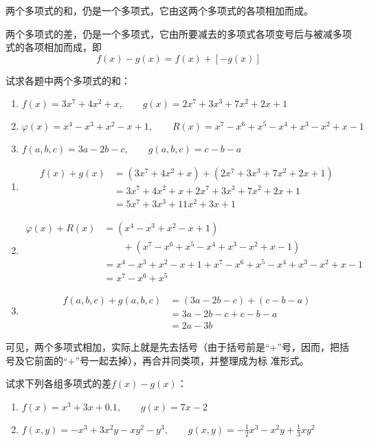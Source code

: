 两个多项式的和，仍是一个多项式，它由这两个多项式的各项相加而成。

两个多项式的差，仍是一个多项式，它由所要减去的多项式各项变号后与被减多项式的各项相加而成，即 
\[f(x)-g(x)=f(x)+[-g(x)]\]

\begin{example}
    试求各题中两个多项式的和：
\begin{enumerate}
    \item $f(x)=3x^7+4x^2+x,\qquad g(x)=2x^7+3x^3+7x^2+2x+1$
    \item $\varphi(x)=x^4-x^3+x^2-x+1,\qquad R(x)=x^7-x^6+x^5-x^4+x^3-x^2+x-1$
    \item $f(a,b,c)=3a-2b-c,\qquad g(a,b,c)=c-b-a$
\end{enumerate}

\end{example}

\begin{solution}
\begin{enumerate}
    \item \[\begin{split}
        f(x)+g(x)&=(3x^7+4x^2+x)+(2x^7+3x^3+7x^2+2x+1)\\
        &=3x^7+4x^2+x+2x^7+3x^3+7x^2+2x+1\\
&=5x^7+3x^3+11x^2+3x+1
    \end{split}\]
    \item \[\begin{split}
        \varphi(x)+R(x)&=(x^4-x^3+x^2-x+1)\\
        &\qquad +(x^7-x^6+x^5-x^4+x^3-x^2+x-1)\\
        &=x^4-x^3+x^2-x+1+x^7-x^6+x^5-x^4+x^3-x^2+x-1\\
        &=x^7-x^6+x^5
    \end{split}\]
    \item \[\begin{split}
        f(a,b,c)+g(a,b,c)&=(3a-2b-c)+(c-b-a)\\
        &=3a-2b-c+c-b-a\\
&=2a-3b        
    \end{split}\]
\end{enumerate}    
\end{solution}

可见，两个多项式相加，实际上就是先去括号（由于括号前是“$+$”号，因而，把括号及它前面的“$+$”号一起去掉），再合并同类项，并整理成为标
准形式。


\begin{example}
    试求下列各组多项式的差$f(x)-g(x)$：
    \begin{enumerate}
        \item $f(x)=x^3+3x+0.1,\qquad g(x)=7x-2$
        \item $f(x,y)=-x^3+3x^2y-xy^2-y^3,\qquad g(x,y)=-\frac{1}{2}x^3-x^2y+\frac{1}{3}xy^2$
    \end{enumerate}
\end{example}

